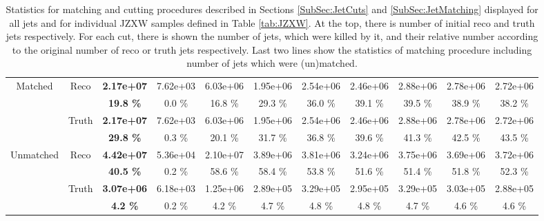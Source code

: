 \begin{appendices}
\begin{landscape}
\begin{table}
\begin{tabular}{|c|c|>{\bfseries}c|c|c|c|c|c|c|c|c|}
    \hline                                                                                      
    \hline                                                                                      
    \multirow{4}{*}{Matched}        & \multirow{2}{*}{Reco}   & 2.17e+07 & 7.62e+03 & 6.03e+06 & 1.95e+06 & 2.54e+06 & 2.46e+06 & 2.88e+06 & 2.78e+06 & 2.72e+06 \\
                                    &                           & 19.8 \%  & 0.0 \%   & 16.8 \%  & 29.3 \%  & 36.0 \%  & 39.1 \%  & 39.5 \%  & 38.9 \%  & 38.2 \%  \\
    \cline{2-11}                                                                                    
                                    & \multirow{2}{*}{Truth}    & 2.17e+07 & 7.62e+03 & 6.03e+06 & 1.95e+06 & 2.54e+06 & 2.46e+06 & 2.88e+06 & 2.78e+06 & 2.72e+06 \\
                                    &                           & 29.8 \%  & 0.3 \%   & 20.1 \%  & 31.7 \%  & 36.8 \%  & 39.6 \%  & 41.3 \%  & 42.5 \%  & 43.5 \%  \\
    \hline                                                                                      
    \hline                                                                                      
    \multirow{4}{*}{Unmatched}      & \multirow{2}{*}{Reco}   & 4.42e+07 & 5.36e+04 & 2.10e+07 & 3.89e+06 & 3.81e+06 & 3.24e+06 & 3.75e+06 & 3.69e+06 & 3.72e+06 \\
                                    &                           & 40.5 \%  & 0.2 \%   & 58.6 \%  & 58.4 \%  & 53.8 \%  & 51.6 \%  & 51.4 \%  & 51.8 \%  & 52.3 \%  \\
    \cline{2-11}                                                                                    
                                    & \multirow{2}{*}{Truth}    & 3.07e+06 & 6.18e+03 & 1.25e+06 & 2.89e+05 & 3.29e+05 & 2.95e+05 & 3.29e+05 & 3.03e+05 & 2.88e+05 \\
                                    &                           & 4.2 \%   & 0.2 \%   & 4.2 \%   & 4.7 \%   & 4.8 \%   & 4.8 \%   & 4.7 \%   & 4.6 \%   & 4.6 \%   \\
    \hline
  \end{tabular}
  \caption{Statistics for matching and cutting procedures described in Sections
    \ref{SubSec:JetCuts} and \ref{SubSec:JetMatching} displayed for all jets and for
    individual JZXW samples defined in Table \ref{tab:JZXW}. At the top, there is
    number of initial reco and truth jets respectively. For each cut, there is
    shown the number of jets, which were killed by it, and their relative number
    according to the original number of reco or truth jets respectively.
    Last two lines show the statistics of matching procedure including number of
    jets which were (un)matched.}
  \label{tab:CutAndMatchingEfficiency}
\end{table} 
\end{landscape}


\end{appendices}
